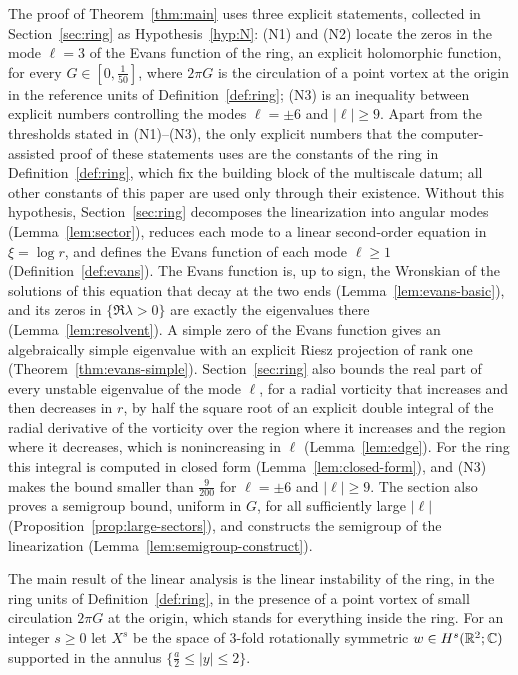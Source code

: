The proof of Theorem~\ref{thm:main} uses three explicit statements, collected in Section~\ref{sec:ring}
as Hypothesis~\ref{hyp:N}: \textup{(N1)} and \textup{(N2)} locate the zeros in
the mode $\ell=3$ of the Evans function of the ring, an explicit holomorphic
function, for every $G\in[0,\frac1{50}]$, where $2\pi G$ is the circulation of
a point vortex at the origin in the reference units of
Definition~\ref{def:ring}; \textup{(N3)} is an inequality between explicit
numbers controlling the modes $\ell=\pm6$ and $|\ell|\ge9$. Apart from the
thresholds stated in \textup{(N1)}--\textup{(N3)}, the only explicit numbers that
the computer-assisted proof of these statements uses are the constants of the ring
in Definition~\ref{def:ring}, which fix the building block of the multiscale datum;
all other constants of this paper are used only through their existence. Without
this hypothesis, Section~\ref{sec:ring} decomposes the linearization into angular
modes (Lemma~\ref{lem:sector}), reduces each mode to a linear second-order
equation in $\xi=\log r$, and defines the Evans function of each mode
$\ell\ge1$ (Definition~\ref{def:evans}). The Evans function is, up to sign, the Wronskian of
the solutions of this equation that decay at the two ends
(Lemma~\ref{lem:evans-basic}), and its zeros in $\{\Re\lambda>0\}$ are exactly
the eigenvalues there (Lemma~\ref{lem:resolvent}). A simple zero of the Evans
function gives an algebraically simple eigenvalue with an explicit Riesz
projection of rank one (Theorem~\ref{thm:evans-simple}).
Section~\ref{sec:ring} also bounds the real part of every unstable eigenvalue
of the mode $\ell$, for a radial vorticity that increases and then decreases
in $r$, by half the square root of an explicit double integral of the radial
derivative of the
vorticity over the region where it increases and the region where it decreases,
which is nonincreasing in $\ell$ (Lemma~\ref{lem:edge}). For the ring this
integral is computed in closed form (Lemma~\ref{lem:closed-form}), and
\textup{(N3)} makes the bound smaller than $\frac9{200}$ for $\ell=\pm6$ and
$|\ell|\ge9$. The section also proves a semigroup bound, uniform in $G$, for all
sufficiently large $|\ell|$ (Proposition~\ref{prop:large-sectors}), and constructs the
semigroup of the linearization (Lemma~\ref{lem:semigroup-construct}).

The main result of the linear analysis is the linear instability of the ring,
in the ring units of Definition~\ref{def:ring}, in the presence of a point vortex
of small circulation $2\pi G$ at the origin, which stands for everything inside
the ring. For an integer $s\ge0$ let $X^s$ be the space of $3$-fold rotationally
symmetric $w\in H^s(\mathbb{R}^2;\mathbb{C})$ supported in the annulus $\{\frac a2\le|y|\le2\}$.

